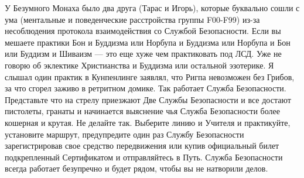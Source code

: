 У Безумного Монаха было два друга (Тарас и Игорь), которые буквально сошли с ума (ментальные и поведенческие расстройства группы F00-F99) из-за несоблюдения протокола взаимодействия со Службой Безопасности. Если вы мешаете практики Бон и Буддизма или Норбупа и Буддизма или Норбупа и Бон  или Буддизм и Шиваизм — это еще хуже чем практиковать под ЛСД. Уже не говорю об эклектике Христианства и Буддизма или остальной эзотерике. Я слышал один практик в Кунпенлинге заявлял, что Ригпа невозможен без Грибов, за что сгорел заживо в ретритном домике. Так работает Служба Безопасности. Представьте что на стрелу приезжают Две Службы Безопасности и все достают пистолеты, гранаты и начинается выяснение чья Служба Безопасности более кошерная и крутая. Не делайте так. Выберите линию и Учителя и практикуйте, установите маршрут, предупредите один раз Службу Безопасности зарегистрировав свое средство передвижения или купив официальный билет подкрепленный Сертификатом и отправляйтесь в Путь. Служба Безопасности всегда работает безупречно и будет рядом, чтобы вы не натворили делов.

